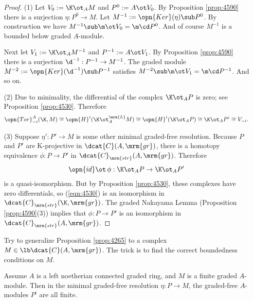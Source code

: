 \begin{proof} \mbox{}

\smallskip \noindent
(1) Let $V_0 := \K \ot_A M$ and $P^0 := A \ot V_0$. By 
Proposition \ref{prop:4590} there is a surjection 
$\eta : P^0 \to M$. Let 
$M^{-1} := \opn{Ker}(\eta) \sub P^0$. 
By construction we have 
$M^{-1} \sub \m \ot V_0 = \m \cd P^0$. 
And of course $M^{-1}$ is a bounded below graded $A$-module. 

Next let $V_{1} := \K \ot_A M^{-1}$ and $P^{-1} := A \ot V_{1}$. 
By Proposition \ref{prop:4590} there is a surjection 
$\d^{-1} : P^{-1} \to M^{-1}$. The graded module  
$M^{-2} := \opn{Ker}(\d^{-1}) \sub P^{-1}$
satisfies $M^{-2} \sub \m \ot V_1 = \m \cd P^{-1}$.
And so on. 

\medskip \noindent
(2) Due to minimality, the differential of the complex $\K \ot_A P$ is zero; 
see Proposition \ref{prop:4530}. Therefore
\[ \opn{Tor}^A_{-i}(\K, M) \cong \opn{H}^i(\K \ot^{\mrm{L}}_{A} M) \cong 
\opn{H}^i(\K \ot_{A} P) \cong \K \ot_{A} P^{i} \cong V_{-i} . \]

\medskip \noindent
(3) Suppose $\eta' : P' \to M$ is some other minimal graded-free resolution.
Because $P$ and $P'$ are K-projective in $\dcat{C}(A, \mrm{gr})$, there is a 
homotopy equivalence $\phi : P \to P'$ in $\dcat{C}_{\mrm{str}}(A, \mrm{gr})$.
Therefore 
\begin{equation} \label{eqn:4530}
\opn{id} \ot \, \phi : \K \ot_A P \to \K \ot_A P'
\end{equation}
is a quasi-isomorphism. But by Proposition \ref{prop:4530}, these complexes 
have zero differentials, so (\ref{eqn:4530}) is an isomorphism in 
$\dcat{C}_{\mrm{str}}(\K, \mrm{gr})$. The graded Nakayama Lemma (Proposition 
\ref{prop:4590}(3)) implies that $\phi : P \to P'$ is an isomorphism in 
$\dcat{C}_{\mrm{str}}(A, \mrm{gr})$.
\end{proof}

\begin{exer} \label{exer:4531}
Try to generalize Proposition \ref{prop:4265} to a complex 
$M \in \lb \dcat{C}(A, \mrm{gr})$. The trick is to find the correct
boundedness conditions on $M$.
\end{exer}

\begin{cor} \label{cor:4237}
Assume $A$ is a left noetherian connected graded ring, and $M$ is a 
finite graded $A$-module. Then in the minimal graded-free 
resolution $\eta : P \to M$, the graded-free $A$-modules $P^i$ are all finite. 
\end{cor}

